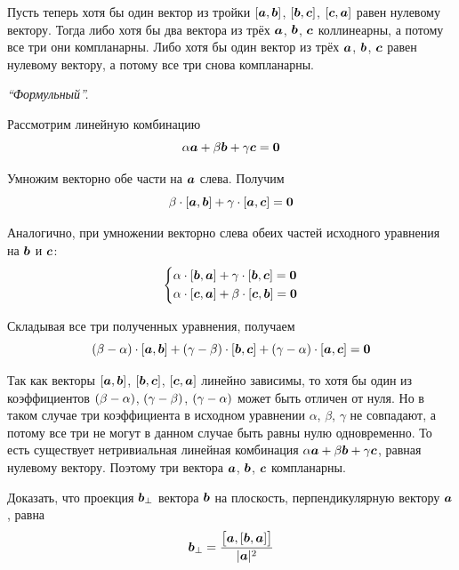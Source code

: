 \documentclass[a4paper,12pt]{article}
\begin{document}
\begin{solution}
    Пусть теперь хотя бы один вектор из тройки $[\boldsymbol a, \boldsymbol b]$, $[\boldsymbol b, \boldsymbol c]$, $[\boldsymbol c, \boldsymbol a]$ равен нулевому вектору.
    Тогда либо хотя бы два вектора из трёх $\boldsymbol a$, $\boldsymbol b$, $\boldsymbol c$ коллинеарны, а потому все три они компланарны.
    Либо хотя бы один вектор из трёх $\boldsymbol a$, $\boldsymbol b$, $\boldsymbol c$ равен нулевому вектору, а потому все три снова компланарны.
  
    \bigskip
    
    \emph{``Формульный''.}
    
    Рассмотрим линейную комбинацию
    \[
      \alpha \boldsymbol a + \beta \boldsymbol b + \gamma \boldsymbol c = \boldsymbol 0
    \]
    
    Умножим векторно обе части на $\boldsymbol a$ слева.
    Получим
    \[
      \beta \cdot [\boldsymbol a, \boldsymbol b] + \gamma \cdot [\boldsymbol a, \boldsymbol c] = \boldsymbol 0
    \]
    
    Аналогично, при умножении векторно слева обеих частей исходного уравнения на $\boldsymbol b$ и $\boldsymbol c$:
    \[
      \left\{
        \begin{aligned}
          &\alpha \cdot [\boldsymbol b, \boldsymbol a] + \gamma \cdot [\boldsymbol b, \boldsymbol c] = \boldsymbol 0\\
          &\alpha \cdot [\boldsymbol c, \boldsymbol a] + \beta \cdot [\boldsymbol c, \boldsymbol b] = \boldsymbol 0
        \end{aligned}
      \right.
    \]
    
    Складывая все три полученных уравнения, получаем
    \[
      (\beta - \alpha) \cdot [\boldsymbol a, \boldsymbol b] + (\gamma - \beta) \cdot [\boldsymbol b, \boldsymbol c] + (\gamma - \alpha) \cdot [\boldsymbol a, \boldsymbol c] = \boldsymbol 0
    \]
    
    Так как векторы $[\boldsymbol a, \boldsymbol b]$, $[\boldsymbol b, \boldsymbol c]$, $[\boldsymbol c, \boldsymbol a]$ линейно зависимы, то хотя бы один из коэффициентов $(\beta \hm- \alpha)$, $(\gamma \hm- \beta)$, $(\gamma \hm- \alpha)$ может быть отличен от нуля.
    Но в таком случае три коэффициента в исходном уравнении $\alpha$, $\beta$, $\gamma$ не совпадают, а потому все три не могут в данном случае быть равны нулю одновременно.
    То есть существует нетривиальная линейная комбинация $\alpha \bds a \hm+ \beta \bds b \hm+ \gamma \bds c$, равная нулевому вектору.
    Поэтому три вектора $\boldsymbol a$, $\boldsymbol b$, $\boldsymbol c$ компланарны.
  \end{solution}
  
  
  \begin{problem}[3.27]
    Доказать, что проекция $\boldsymbol b_{\perp}$ вектора $\boldsymbol b$ на плоскость, перпендикулярную вектору $\boldsymbol a$, равна
    \[
      \boldsymbol b_{\perp} = \frac{\bigl[\boldsymbol a, [\boldsymbol b, \boldsymbol a]\bigr]}{|\boldsymbol a|^2}
    \]
  \end{problem}
  
\end{document}
